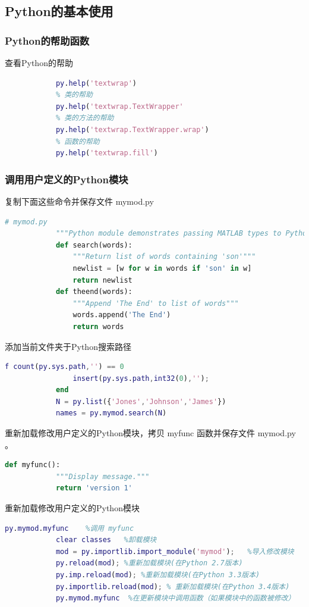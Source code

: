     \subsection{Python的基本使用}
        \subsubsection{Python的帮助函数}
            \par
            查看Python的帮助
            \begin{lstlisting}[language = Matlab]
            % 包的帮助
            py.help('textwrap')
            % 类的帮助
            py.help('textwrap.TextWrapper'
            % 类的方法的帮助
            py.help('textwrap.TextWrapper.wrap')
            % 函数的帮助
            py.help('textwrap.fill')
            \end{lstlisting}
        \subsubsection{调用用户定义的Python模块}
            \par
            复制下面这些命令并保存文件 mymod.py
            \begin{lstlisting}[language= Python]
            # mymod.py
            """Python module demonstrates passing MATLAB types to Python functions"""
            def search(words):
                """Return list of words containing 'son'"""
                newlist = [w for w in words if 'son' in w]
                return newlist
            def theend(words):
                """Append 'The End' to list of words"""
                words.append('The End')
                return words
            \end{lstlisting}
            \par
            添加当前文件夹于Python搜索路径
            \begin{lstlisting}[language = Matlab]
            f count(py.sys.path,'') == 0
                insert(py.sys.path,int32(0),'');
            end
            N = py.list({'Jones','Johnson','James'})
            names = py.mymod.search(N)
            \end{lstlisting}
            \par
            重新加载修改用户定义的Python模块，拷贝 myfunc 函数并保存文件 mymod.py 。
            \begin{lstlisting}[language = Python]
            def myfunc():
            """Display message."""
            return 'version 1'
            \end{lstlisting}
            \par
            重新加载修改用户定义的Python模块
            \begin{lstlisting}[language = Matlab]
            py.mymod.myfunc    %调用 myfunc
            clear classes   %卸载模块
            mod = py.importlib.import_module('mymod');   %导入修改模块
            py.reload(mod); %重新加载模块(在Python 2.7版本)
            py.imp.reload(mod); %重新加载模块(在Python 3.3版本)
            py.importlib.reload(mod); % 重新加载模块(在Python 3.4版本)
            py.mymod.myfunc  %在更新模块中调用函数（如果模块中的函数被修改）
            \end{lstlisting}
